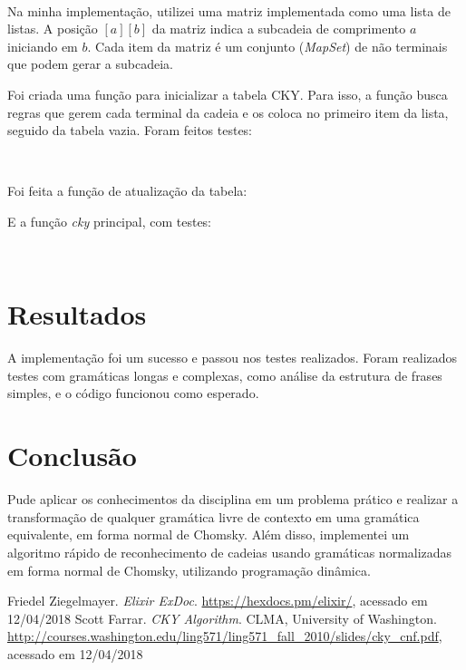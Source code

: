 \documentclass[conference]{IEEEtran}
\begin{document}
\

Na minha implementação, utilizei uma matriz implementada como uma lista de listas. A posição $[a][b]$ da matriz indica a subcadeia de comprimento $a$ iniciando em $b$. Cada item da matriz é um conjunto (\emph{MapSet}) de não terminais que podem gerar a subcadeia.

Foi criada uma função para inicializar a tabela CKY. Para isso, a função busca regras que gerem cada terminal da cadeia e os coloca no primeiro item da lista, seguido da tabela vazia. Foram feitos testes:



\



Foi feita a função de atualização da tabela:



E a função \emph{cky} principal, com testes:



\



\section{Resultados}

A implementação foi um sucesso e passou nos testes realizados. Foram realizados testes com gramáticas longas e complexas, como análise da estrutura de frases simples, e o código funcionou como esperado.

\section{Conclusão}

Pude aplicar os conhecimentos da disciplina em um problema prático e realizar a transformação de qualquer gramática livre de contexto em uma gramática equivalente, em forma normal de Chomsky. Além disso, implementei um algoritmo rápido de reconhecimento de cadeias usando gramáticas normalizadas em forma normal de Chomsky, utilizando programação dinâmica.

\begin{thebibliography}{1}
Friedel Ziegelmayer. \emph{Elixir ExDoc}. \url{https://hexdocs.pm/elixir/}, acessado em 12/04/2018
Scott Farrar. \emph{CKY Algorithm}. CLMA, University of Washington. \url{http://courses.washington.edu/ling571/ling571_fall_2010/slides/cky_cnf.pdf}, acessado em 12/04/2018
\end{thebibliography}
\end{document}
